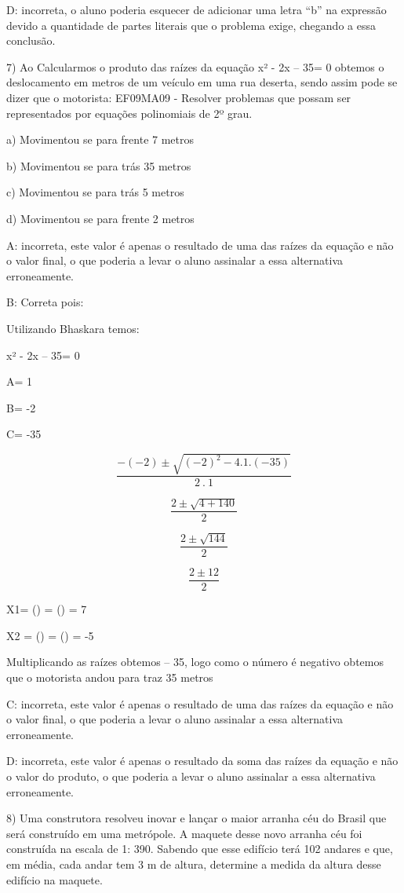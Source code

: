 D: incorreta, o aluno poderia esquecer de adicionar uma letra ``b'' na
expressão devido a quantidade de partes literais que o problema exige,
chegando a essa conclusão.

7) Ao Calcularmos o produto das raízes da equação x² - 2x -- 35= 0
obtemos o deslocamento em metros de um veículo em uma rua deserta, sendo
assim pode se dizer que o motorista: EF09MA09 - Resolver problemas que
possam ser representados por equações polinomiais de 2º grau.

a) Movimentou se para frente 7 metros

b) Movimentou se para trás 35 metros

c) Movimentou se para trás 5 metros

d) Movimentou se para frente 2 metros

A: incorreta, este valor é apenas o resultado de uma das raízes da
equação e não o valor final, o que poderia a levar o aluno assinalar a
essa alternativa erroneamente.

B: Correta pois:

Utilizando Bhaskara temos:

x² - 2x -- 35= 0

A= 1

B= -2

C= -35

\[\frac{- ( - 2) \pm \sqrt{{( - 2)}^{2} - 4.1.( - 35)}}{2\ .\ 1}\]

\[\frac{2 \pm \sqrt{4 + 140}}{2}\]

\[\frac{2 \pm \sqrt{144}}{2}\]

\[\frac{2 \pm 12}{2}\]

X1= () = () = 7

X2 = () = () = -5

Multiplicando as raízes obtemos -- 35, logo como o número é negativo
obtemos que o motorista andou para traz 35 metros

C: incorreta, este valor é apenas o resultado de uma das raízes da
equação e não o valor final, o que poderia a levar o aluno assinalar a
essa alternativa erroneamente.

D: incorreta, este valor é apenas o resultado da soma das raízes da
equação e não o valor do produto, o que poderia a levar o aluno
assinalar a essa alternativa erroneamente.

8) Uma construtora resolveu inovar e lançar o maior arranha céu do
Brasil que será construído em uma metrópole. A maquete desse novo
arranha céu foi construída na escala de 1: 390. Sabendo que esse
edifício terá 102 andares e que, em média, cada andar tem 3 m de altura,
determine a medida da altura desse edifício na maquete.

